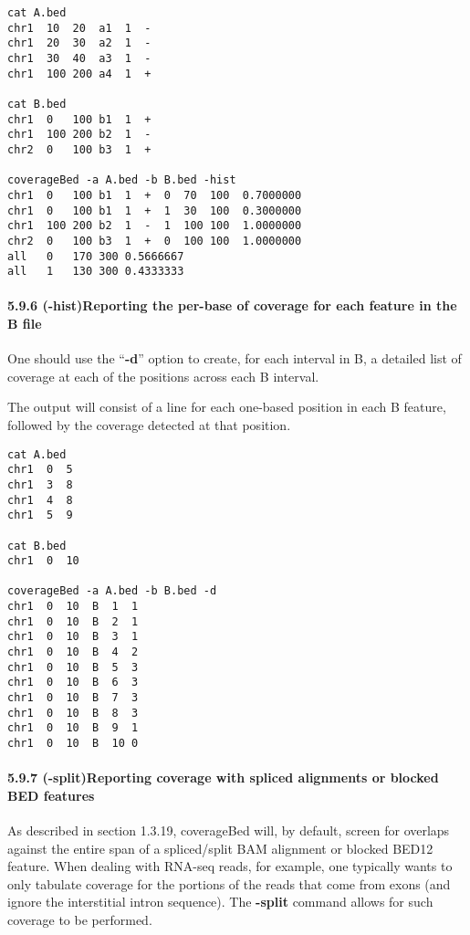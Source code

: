 \documentclass[letterpaper,10pt,english]{sphinxmanual}
\begin{document}
\begin{Verbatim}[commandchars=\\\{\}]
cat A.bed
chr1  10  20  a1  1  -
chr1  20  30  a2  1  -
chr1  30  40  a3  1  -
chr1  100 200 a4  1  +

cat B.bed
chr1  0   100 b1  1  +
chr1  100 200 b2  1  -
chr2  0   100 b3  1  +

coverageBed -a A.bed -b B.bed -hist
chr1  0   100 b1  1  +  0  70  100  0.7000000
chr1  0   100 b1  1  +  1  30  100  0.3000000
chr1  100 200 b2  1  -  1  100 100  1.0000000
chr2  0   100 b3  1  +  0  100 100  1.0000000
all   0   170 300 0.5666667
all   1   130 300 0.4333333
\end{Verbatim}


\paragraph{5.9.6 (-hist)Reporting the per-base of coverage for each feature in the B file}
\label{content/coverageBed:hist-reporting-the-per-base-of-coverage-for-each-feature-in-the-b-file}
One should use the ``\textbf{-d}'' option to create, for each interval in B, a detailed list of coverage at each of the
positions across each B interval.

The output will consist of a line for each one-based position in each B feature, followed by the coverage
detected at that position.

\begin{Verbatim}[commandchars=\\\{\}]
cat A.bed
chr1  0  5
chr1  3  8
chr1  4  8
chr1  5  9

cat B.bed
chr1  0  10

coverageBed -a A.bed -b B.bed -d
chr1  0  10  B  1  1
chr1  0  10  B  2  1
chr1  0  10  B  3  1
chr1  0  10  B  4  2
chr1  0  10  B  5  3
chr1  0  10  B  6  3
chr1  0  10  B  7  3
chr1  0  10  B  8  3
chr1  0  10  B  9  1
chr1  0  10  B  10 0
\end{Verbatim}


\paragraph{5.9.7 (-split)Reporting coverage with spliced alignments or blocked BED features}
\label{content/coverageBed:split-reporting-coverage-with-spliced-alignments-or-blocked-bed-features}
As described in section 1.3.19, coverageBed will, by default, screen for overlaps against the entire span
of a spliced/split BAM alignment or blocked BED12 feature. When dealing with RNA-seq reads, for
example, one typically wants to only tabulate coverage for the portions of the reads that come from
exons (and ignore the interstitial intron sequence). The \textbf{-split} command allows for such coverage to be
performed.
\end{document}

